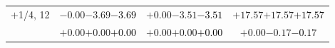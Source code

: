\documentclass[compress]{beamer}
\begin{document}
\begin{frame}
\begin{tabular}{r | c | c | c}
$+$1/4, 12 & $-0.00$\hspace{0.1 cm}$-3.69$\hspace{0.1 cm}\textcolor{black}{$-3.69$} & $+0.00$\hspace{0.1 cm}$-3.51$\hspace{0.1 cm}\textcolor{black}{$-3.51$} & $+17.57$\hspace{0.1 cm}$+17.57$\hspace{0.1 cm}\textcolor{black}{$+17.57$} \\
           & $+0.00$\hspace{0.1 cm}$+0.00$\hspace{0.1 cm}\textcolor{black}{$+0.00$} & $+0.00$\hspace{0.1 cm}$+0.00$\hspace{0.1 cm}\textcolor{black}{$+0.00$} & $+0.00$\hspace{0.1 cm}$-0.17$\hspace{0.1 cm}\textcolor{black}{$-0.17$} \\
\end{tabular}
\end{frame}
\end{document}
